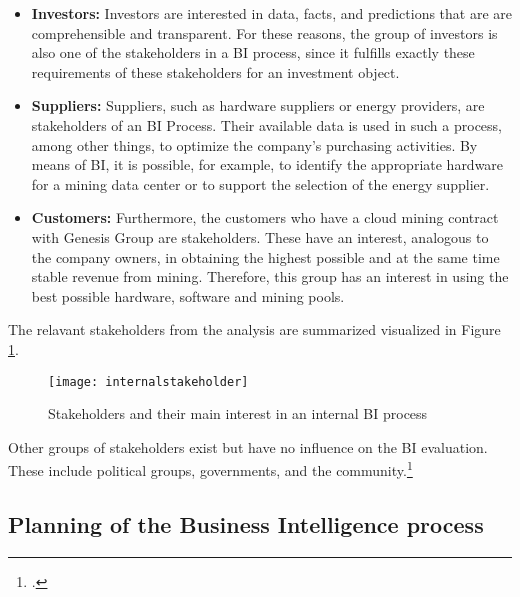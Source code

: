\begin{itemize}
    \item \textbf{Investors: }Investors are interested in data, facts, and predictions that are
    are comprehensible and transparent. For these reasons, the group of investors is also one of the stakeholders in a \ac{BI} process,
    since it fulfills exactly these requirements of these stakeholders for an investment object.
    \item \textbf{Suppliers: }Suppliers, such as hardware suppliers or energy providers, are stakeholders of an
    \ac{BI} Process. Their available data is used in such a process, among other things, to optimize the company's purchasing activities.
    By means of \ac{BI}, it is possible, for example, to identify the appropriate hardware for a mining data center
    or to support the selection of the energy supplier.
    \item \textbf{Customers: }Furthermore, the customers who have a cloud mining contract with Genesis Group are stakeholders. These
    have an interest, analogous to the company owners, in obtaining the highest possible and at the same time stable revenue from mining. 
    Therefore, this group has an interest in using the best possible hardware, software and mining pools.
\end{itemize}

The relavant stakeholders from the analysis are summarized visualized in Figure \ref{figure:internalstakeholder}.

\begin{figure}[H]
    \caption{Stakeholders and their main interest in an internal \ac{BI} process}
    \texttt{[image: internalstakeholder]}
    \label{figure:internalstakeholder}
\end{figure}

Other groups of stakeholders exist but have no influence on the \ac{BI} evaluation.
These include political groups, governments, and the community.\footcite[Cf.][Fig. 14.2]{simmers2004stakeholder}

\subsection{Planning of the Business Intelligence process} \label{toc:planungdesbiprozesses}

